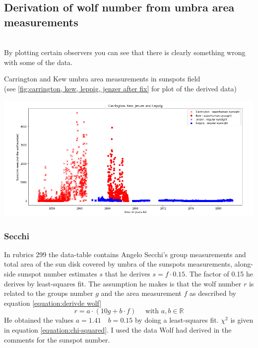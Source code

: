 \documentclass[12pt]{article}
\newcommand{\R}{\mathbb{R}}
\begin{document}
\subsection{Derivation of wolf number from umbra area measurements}\label{section:derivation from area}\\

By plotting certain observers you can see that there is clearly something wrong with some of the data.\\

{\centering
\caption{Carrington and Kew umbra area measurements in sunspots field \\(see \ref{fig:carrington, kew, leppig, jenzer after fix} for plot of the derived data)}
\includegraphics[width=\linewidth]{CarringtonHasGoodEyesight.png}\label{fig:carrington kew jenzer leppig sunspots plot}
\par}

\subsubsection{Secchi}
In rubrics 299 the data-table contains Angelo Secchi's group measurements and total area of the sun disk covered by umbra of the sunspots measurements, along-side sunspot number estimates $s$ that he derives $s = f \cdot 0.15$. The factor of 0.15 he derives by least-squares fit. The assumption he makes is that the wolf number $r$ is related to the groups number $g$ and the area measurement $f$ as described by equation \ref{equation:derivde wolf}
$$
r = a \cdot (10 g + b\cdot f)\quad \text{ with } a,b\in\R
$$
He obtained the values $a = 1.41\quad b=0.15$ by doing a least-squares fit. $\chi^2$ is given in equation \ref{equation:chi-squared}. I used the data Wolf had derived in the comments for the sunspot number.\\
\end{document}
